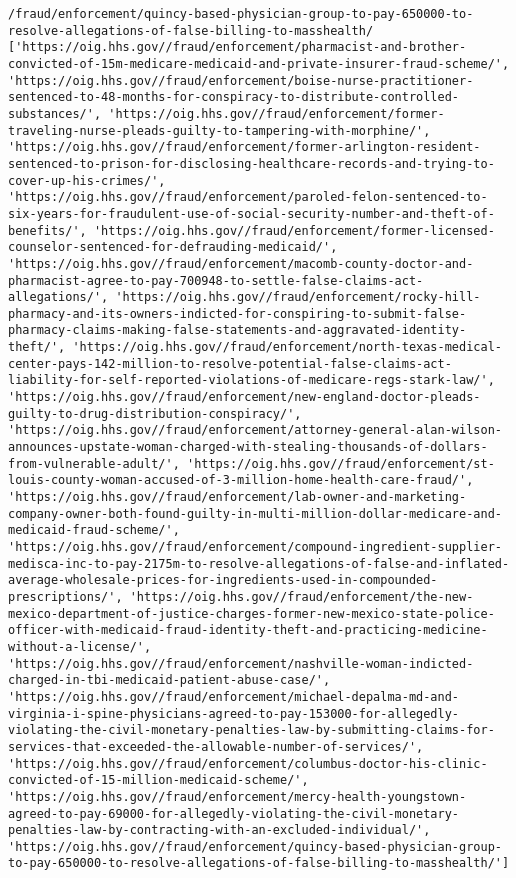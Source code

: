 \documentclass[
  letterpaper,
  DIV=11,
  numbers=noendperiod]{scrartcl}
\begin{document}
\begin{verbatim}
/fraud/enforcement/quincy-based-physician-group-to-pay-650000-to-resolve-allegations-of-false-billing-to-masshealth/
['https://oig.hhs.gov//fraud/enforcement/pharmacist-and-brother-convicted-of-15m-medicare-medicaid-and-private-insurer-fraud-scheme/', 'https://oig.hhs.gov//fraud/enforcement/boise-nurse-practitioner-sentenced-to-48-months-for-conspiracy-to-distribute-controlled-substances/', 'https://oig.hhs.gov//fraud/enforcement/former-traveling-nurse-pleads-guilty-to-tampering-with-morphine/', 'https://oig.hhs.gov//fraud/enforcement/former-arlington-resident-sentenced-to-prison-for-disclosing-healthcare-records-and-trying-to-cover-up-his-crimes/', 'https://oig.hhs.gov//fraud/enforcement/paroled-felon-sentenced-to-six-years-for-fraudulent-use-of-social-security-number-and-theft-of-benefits/', 'https://oig.hhs.gov//fraud/enforcement/former-licensed-counselor-sentenced-for-defrauding-medicaid/', 'https://oig.hhs.gov//fraud/enforcement/macomb-county-doctor-and-pharmacist-agree-to-pay-700948-to-settle-false-claims-act-allegations/', 'https://oig.hhs.gov//fraud/enforcement/rocky-hill-pharmacy-and-its-owners-indicted-for-conspiring-to-submit-false-pharmacy-claims-making-false-statements-and-aggravated-identity-theft/', 'https://oig.hhs.gov//fraud/enforcement/north-texas-medical-center-pays-142-million-to-resolve-potential-false-claims-act-liability-for-self-reported-violations-of-medicare-regs-stark-law/', 'https://oig.hhs.gov//fraud/enforcement/new-england-doctor-pleads-guilty-to-drug-distribution-conspiracy/', 'https://oig.hhs.gov//fraud/enforcement/attorney-general-alan-wilson-announces-upstate-woman-charged-with-stealing-thousands-of-dollars-from-vulnerable-adult/', 'https://oig.hhs.gov//fraud/enforcement/st-louis-county-woman-accused-of-3-million-home-health-care-fraud/', 'https://oig.hhs.gov//fraud/enforcement/lab-owner-and-marketing-company-owner-both-found-guilty-in-multi-million-dollar-medicare-and-medicaid-fraud-scheme/', 'https://oig.hhs.gov//fraud/enforcement/compound-ingredient-supplier-medisca-inc-to-pay-2175m-to-resolve-allegations-of-false-and-inflated-average-wholesale-prices-for-ingredients-used-in-compounded-prescriptions/', 'https://oig.hhs.gov//fraud/enforcement/the-new-mexico-department-of-justice-charges-former-new-mexico-state-police-officer-with-medicaid-fraud-identity-theft-and-practicing-medicine-without-a-license/', 'https://oig.hhs.gov//fraud/enforcement/nashville-woman-indicted-charged-in-tbi-medicaid-patient-abuse-case/', 'https://oig.hhs.gov//fraud/enforcement/michael-depalma-md-and-virginia-i-spine-physicians-agreed-to-pay-153000-for-allegedly-violating-the-civil-monetary-penalties-law-by-submitting-claims-for-services-that-exceeded-the-allowable-number-of-services/', 'https://oig.hhs.gov//fraud/enforcement/columbus-doctor-his-clinic-convicted-of-15-million-medicaid-scheme/', 'https://oig.hhs.gov//fraud/enforcement/mercy-health-youngstown-agreed-to-pay-69000-for-allegedly-violating-the-civil-monetary-penalties-law-by-contracting-with-an-excluded-individual/', 'https://oig.hhs.gov//fraud/enforcement/quincy-based-physician-group-to-pay-650000-to-resolve-allegations-of-false-billing-to-masshealth/']
\end{verbatim}
\end{document}
